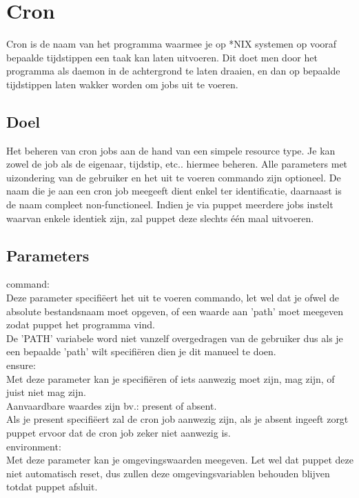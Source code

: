 \section{Cron}
Cron is de naam van het programma waarmee je op *NIX systemen op vooraf bepaalde tijdstippen een taak kan laten uitvoeren. Dit doet men door het programma als daemon in de achtergrond te laten draaien, en dan op bepaalde tijdstippen laten wakker worden om jobs uit te voeren.

\subsection{Doel}
Het beheren van cron jobs aan de hand van een simpele resource type. Je kan zowel de job als de eigenaar, tijdstip, etc.. hiermee beheren. Alle parameters met uizondering van de gebruiker en het uit te voeren commando zijn optioneel. De naam die je aan een cron job meegeeft dient enkel ter identificatie, daarnaast is de naam compleet non-functioneel. Indien je via puppet meerdere jobs instelt waarvan enkele identiek zijn, zal puppet deze slechts \'{e}\'{e}n maal uitvoeren.

\subsection{Parameters}
command:\\
Deze parameter specifi\"{e}ert het uit te voeren commando, let wel dat je ofwel de absolute bestandsnaam moet opgeven, of een waarde aan 'path' moet meegeven zodat puppet het programma vind.\\
De 'PATH' variabele word niet vanzelf overgedragen van de gebruiker dus als je een bepaalde 'path' wilt specifi\"{e}ren dien je dit manueel te doen.\\

ensure:\\
Met deze parameter kan je specifi\"{e}ren of iets aanwezig moet zijn, mag zijn, of juist niet mag zijn.\\
Aanvaardbare waardes zijn bv.: present of absent.\\
Als je present specifi\"{e}ert zal de cron job aanwezig zijn, als je absent ingeeft zorgt puppet ervoor dat de cron job zeker niet aanwezig is.\\

environment:\\
Met deze parameter kan je omgevingswaarden meegeven. Let wel dat puppet deze niet automatisch reset, dus zullen deze omgevingsvariablen behouden blijven totdat puppet afsluit.\\


